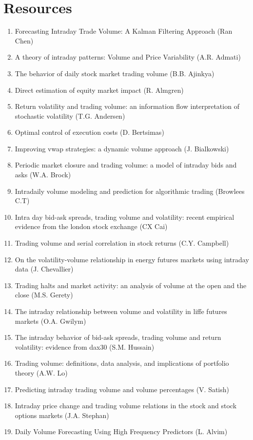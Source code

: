 \documentclass[11pt]{paper}
\begin{document}
\newpage
\section*{Resources}

\begin{enumerate}
\setlength{\itemsep}{0pt}
  \setlength{\parskip}{0pt}
\item Forecasting Intraday Trade Volume: A Kalman Filtering Approach (Ran Chen)
\item A theory of intraday patterns: Volume and Price Variability (A.R. Admati)
\item The behavior of daily stock market trading volume (B.B. Ajinkya)
\item Direct estimation of equity market impact (R. Almgren)
\item Return volatility and trading volume: an information flow interpretation of stochastic volatility (T.G. Andersen)
\item Optimal control of execution costs (D. Bertsimas)
\item Improving vwap strategies: a dynamic volume approach (J. Bialkowski)
\item Periodic market closure and trading volume: a model of intraday bids and asks (W.A. Brock)
\item Intradaily volume modeling and prediction for algorithmic trading (Browlees C.T)
\item Intra day bid-ask spreads, trading volume and volatility: recent empirical evidence from the london stock exchange (CX Cai)
\item Trading volume and serial correlation in stock returns (C.Y. Campbell)
\item On the volatility-volume relationship in energy futures markets using intraday data (J. Chevallier)
\item Trading halts and market activity: an analysis of volume at the open and the close (M.S. Gerety)
\item The intraday relationship between volume and volatility in liffe futures markets (O.A. Gwilym)
\item The intraday behavior of bid-ask spreads, trading volume and return volatility: evidence from dax30 (S.M. Hussain)
\item Trading volume: definitions, data analysis, and implications of portfolio theory (A.W. Lo)
\item Predicting intraday trading volume and volume percentages (V. Satish)
\item Intraday price change and trading volume relations in the stock and stock options markets (J.A. Stephan)
\item Daily Volume Forecasting Using High Frequency Predictors (L. Alvim)

\end{enumerate}
\end{document}
